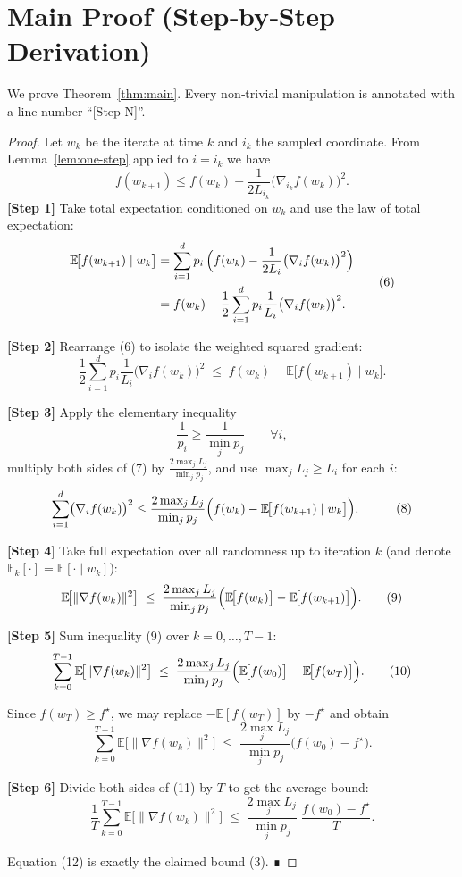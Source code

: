 \documentclass{article}
\newcommand{\E}{\mathbb{E}}
\begin{document}
\section*{Main Proof (Step‑by‑Step Derivation)}
We prove Theorem~\ref{thm:main}. Every non‑trivial manipulation is annotated
with a line number ``[Step N]''.

\begin{proof}
Let $w_k$ be the iterate at time $k$ and $i_k$ the sampled coordinate.
From Lemma~\ref{lem:one-step} applied to $i=i_k$ we have
\begin{equation}
f(w_{k+1}) \le f(w_k) - 
\frac{1}{2L_{i_k}}\bigl(\nabla_{i_k} f(w_k)\bigr)^2 .
\tag{5}
\end{equation}
\textbf{[Step 1]} Take total expectation conditioned on $w_k$ and use the law of
total expectation:
\[
\begin{aligned}
\E\!\bigl[f(w_{k+1})\mid w_k\bigr]
&= \sum_{i=1}^d p_i\,
   \Bigl( f(w_k) - \frac{1}{2L_i}\bigl(\nabla_i f(w_k)\bigr)^2 \Bigr) \\
&= f(w_k) - \frac12\sum_{i=1}^d p_i\frac{1}{L_i}
   \bigl(\nabla_i f(w_k)\bigr)^2 .
\end{aligned}
\tag{6}
\]

\textbf{[Step 2]} Rearrange (6) to isolate the weighted squared gradient:
\[
\frac12\sum_{i=1}^d p_i\frac{1}{L_i}
   \bigl(\nabla_i f(w_k)\bigr)^2
   \;\le\; f(w_k)-\E\!\bigl[f(w_{k+1})\mid w_k\bigr] .
\tag{7}
\]

\textbf{[Step 3]} Apply the elementary inequality
\[
\frac{1}{p_i}\ge \frac{1}{\min_j p_j}\qquad\forall i,
\]
multiply both sides of (7) by $\displaystyle \frac{2\max_j L_j}{\min_j p_j}$,
and use $\max_j L_j\ge L_i$ for each $i$:
\[
\begin{aligned}
\sum_{i=1}^d \bigl(\nabla_i f(w_k)\bigr)^2
&\le
\frac{2\max_j L_j}{\min_j p_j}
\Bigl( f(w_k)-\E\!\bigl[f(w_{k+1})\mid w_k\bigr] \Bigr) .
\end{aligned}
\tag{8}
\]

\textbf{[Step 4}] Take full expectation over all randomness up to iteration $k$
(and denote $\E_k[\cdot]=\E[\cdot\mid w_k]$):
\[
\E\!\bigl[\|\nabla f(w_k)\|^2\bigr]
\;\le\;
\frac{2\max_j L_j}{\min_j p_j}
\Bigl( \E\!\bigl[f(w_k)\bigr]-\E\!\bigl[f(w_{k+1})\bigr] \Bigr) .
\tag{9}
\]

\textbf{[Step 5]} Sum inequality (9) over $k=0,\dots,T-1$:
\[
\sum_{k=0}^{T-1}\E\!\bigl[\|\nabla f(w_k)\|^2\bigr]
\;\le\;
\frac{2\max_j L_j}{\min_j p_j}
\Bigl( \E\!\bigl[f(w_0)\bigr]-\E\!\bigl[f(w_T)\bigr] \Bigr) .
\tag{10}
\]

Since $f(w_T)\ge f^\star$, we may replace $-\E[f(w_T)]$ by $-f^\star$ and obtain
\[
\sum_{k=0}^{T-1}\E\!\bigl[\|\nabla f(w_k)\|^2\bigr]
\;\le\;
\frac{2\max_j L_j}{\min_j p_j}
\bigl( f(w_0)-f^\star \bigr) .
\tag{11}
\]

\textbf{[Step 6]} Divide both sides of (11) by $T$ to get the average bound:
\[
\frac{1}{T}\sum_{k=0}^{T-1}\E\!\bigl[\|\nabla f(w_k)\|^2\bigr]
\;\le\;
\frac{2\max_j L_j}{\min_j p_j}\;
\frac{ f(w_0)-f^\star }{T} .
\tag{12}
\]

Equation (12) is exactly the claimed bound (3). ∎
\end{proof}
\end{document}
